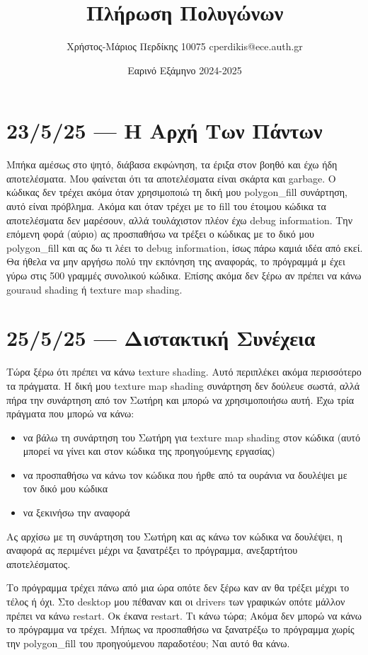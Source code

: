 \documentclass{article}
\title{Πλήρωση Πολυγώνων}
\date{Εαρινό Εξάμηνο 2024-2025}
\author{Χρήστος-Μάριος Περδίκης 10075 cperdikis@ece.auth.gr}
\begin{document}
\maketitle
\section{23/5/25 --- Η Αρχή Των Πάντων}
Μπήκα αμέσως στο ψητό, διάβασα εκφώνηση, τα έριξα στον βοηθό και έχω ήδη 
αποτελέσματα. Μου φαίνεται ότι τα αποτελέσματα είναι σκάρτα και garbage.
Ο κώδικας δεν τρέχει ακόμα όταν χρησιμοποιώ τη δική μου polygon\_fill 
συνάρτηση, αυτό είναι πρόβλημα. Ακόμα και όταν τρέχει με το fill του
έτοιμου κώδικα τα αποτελέσματα δεν μαρέσουν, αλλά τουλάχιστον πλέον έχω 
debug information. Την επόμενη φορά (αύριο) ας προσπαθήσω να τρέξει ο
κώδικας με το δικό μου polygon\_fill και ας δω τι λέει το debug information,
ίσως πάρω καμιά ιδέα από εκεί. Θα ήθελα να μην αργήσω πολύ την εκπόνηση της 
αναφοράς, το πρόγραμμά μ έχει γύρω στις 500 γραμμές συνολικού κώδικα. Επίσης
ακόμα δεν ξέρω αν πρέπει να κάνω gouraud shading ή texture map shading.

\section{25/5/25 --- Διστακτική Συνέχεια}
Τώρα ξέρω ότι πρέπει να κάνω texture shading. Αυτό περιπλέκει ακόμα περισσότερο
τα πράγματα. Η δική μου texture map shading συνάρτηση δεν δούλευε σωστά, αλλά
πήρα την συνάρτηση από τον Σωτήρη και μπορώ να χρησιμοποιήσω αυτή. Έχω τρία πράγματα 
που μπορώ να κάνω:

\begin{itemize}
    \item να βάλω τη συνάρτηση του Σωτήρη για texture map shading στον κώδικα 
        (αυτό μπορεί να γίνει και στον κώδικα της προηγούμενης εργασίας)
    \item να προσπαθήσω να κάνω τον κώδικα που ήρθε από τα ουράνια να δουλέψει 
        με τον δικό μου κώδικα
    \item να ξεκινήσω την αναφορά
\end{itemize}

Ας αρχίσω με τη συνάρτηση του Σωτήρη και ας κάνω τον κώδικα να δουλέψει,
η αναφορά ας περιμένει μέχρι να ξανατρέξει το πρόγραμμα, ανεξαρτήτου 
αποτελέσματος.

Το πρόγραμμα τρέχει πάνω από μια ώρα οπότε δεν ξέρω καν αν θα 
τρέξει μέχρι το τέλος ή όχι. Στο desktop μου πέθαναν και οι 
drivers των γραφικών οπότε μάλλον πρέπει να κάνω restart.
Οκ έκανα restart. Τι κάνω τώρα; Ακόμα δεν μπορώ να κάνω το πρόγραμμα
να τρέχει. Μήπως να προσπαθήσω να ξανατρέξω το πρόγραμμα χωρίς την
polygon\_fill του προηγούμενου παραδοτέου; Ναι αυτό θα κάνω.
\end{document}
